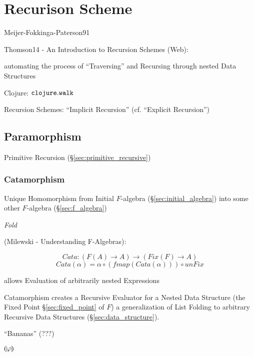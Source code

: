 \section{Recurison Scheme}\label{sec:recursion_scheme}

Meijer-Fokkinga-Paterson91 %

Thomson14 - An Introduction to Recursion Schemes (Web): %

automating the process of ``Traversing'' and Recursing through nested
Data Structures

Clojure: $\mathtt{clojure.walk}$

Recursion Schemes: ``Implicit Recursion'' (cf. ``Explicit Recursion'')



\subsection{Paramorphism}\label{sec:paramorphism}

Primitive Recursion (\S\ref{sec:primitive_recursive})



\subsubsection{Catamorphism}\label{sec:catamorphism}

Unique Homomorphism from Initial $F$-algebra
(\S\ref{sec:initial_algebra}) into some other $F$-algebra
(\S\ref{sec:f_algebra})

\emph{Fold}

(Milewski - Understanding F-Algebras):

\[
  Cata : (F (A) \rightarrow A) \rightarrow (Fix (F) \rightarrow A)
\]\[
  Cata (\alpha) = \alpha \circ (fmap (Cata (\alpha))) \circ unFix
\]

allows Evaluation of arbitrarily nested Expressions

Catamorphism creates a Recursive Evaluator for a Nested Data Structure
(the Fixed Point \S\ref{sec:fixed_point} of $F$) a generalization of
List Folding to arbitrary Recursive Data Structures
(\S\ref{sec:data_structure}).

``Bananas'' (???) %

$\llparenthesis \varphi \rrparenthesis$

